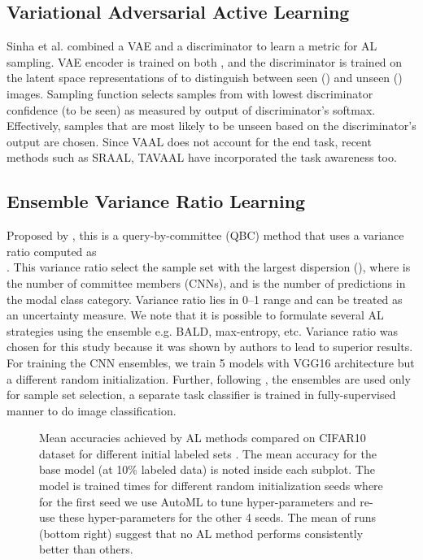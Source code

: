 \documentclass[10pt,twocolumn,letterpaper]{article}
\begin{document}
\subsection{Variational Adversarial Active Learning}
Sinha et al.\cite{VAAL_sinha2019variational} combined a VAE \cite{VAE_kingma} and a discriminator \cite{Goodfellow:2014:GAN:2969033.2969125} to learn a metric for AL sampling. VAE encoder is trained on both , and the discriminator is trained on the latent space representations of  to distinguish between seen () and unseen () images. Sampling function selects samples from  with lowest discriminator confidence (to be seen) as measured by output of discriminator's softmax. Effectively, samples that are most likely to be unseen based on the discriminator's output are chosen. Since VAAL does not account for the end task, recent methods such as SRAAL\cite{SRAAL_zhang2020state}, TAVAAL\cite{tavaal_kim2021task} have incorporated the task awareness too.




\subsection{Ensemble Variance Ratio Learning}
Proposed by \cite{Ensembles_Beluch2018ThePO}, this is a query-by-committee (QBC) method that uses a variance ratio computed as \\
. This variance ratio select the sample set with the largest dispersion (), where  is the number of committee members (CNNs), and  is the number of predictions in the modal class category. Variance ratio lies in 0--1 range and can be treated as an uncertainty measure. We note that it is possible to formulate several AL strategies using the ensemble e.g. BALD, max-entropy, etc. Variance ratio was chosen for this study because it was shown by authors to lead to superior results. For training the CNN ensembles, we train 5 models with VGG16 architecture but a different random initialization. Further, following \cite{Ensembles_Beluch2018ThePO}, the ensembles are used only for sample set selection, a separate task classifier is trained in fully-supervised manner to do image classification.

\begin{figure*}[t]
\begin{center}
  \vspace{-2em}
\end{center}
    \caption{Mean accuracies achieved by AL methods compared on CIFAR10 dataset for different initial labeled sets . The mean accuracy for the base model (at 10\% labeled data) is noted inside each subplot. The model is trained  times for different random initialization seeds where for the first seed we use AutoML to tune hyper-parameters and re-use these hyper-parameters for the other 4 seeds. The mean of  runs (bottom right) suggest that no AL method performs consistently better than others.}
    
\label{fig:cifar_five_lSets_stats_cif10}
  \vspace{-1em}
\end{figure*}
\end{document}
